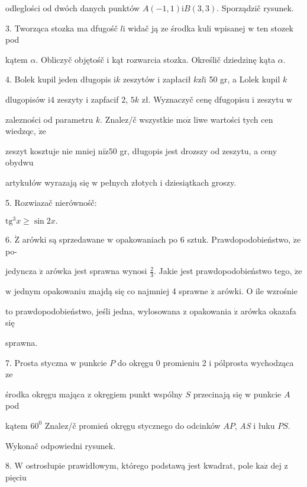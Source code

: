 \documentclass[a4paper,12pt]{article}
\begin{document}
odleglości od dwóch danych punktów $A(-1,1)\mathrm{i}B(3,3)$. Sporządzič rysunek.

3. Tworząca stozka ma dfugośč $l\mathrm{i}$ widač ją ze środka kuli wpisanej $\mathrm{w}$ ten stozek pod

kątem $\alpha$. Obliczyč objętośč $\mathrm{i}$ kąt rozwarcia stozka. Określič dziedzinę kąta $\alpha.$

4. Bolek kupil jeden długopis $\mathrm{i} k$ zeszytów $\mathrm{i}$ zapłacił $k\mathrm{z}l\mathrm{i}$ 50 gr, a Lolek kupil $k$

dlugopisów $\mathrm{i} 4$ zeszyty $\mathrm{i}$ zapfacif 2, $5k$ zł. Wyznaczyč cenę dfugopisu $\mathrm{i}$ zeszytu $\mathrm{w}$

zalezności od parametru $k$. Znalez/č wszystkie $\mathrm{m}\mathrm{o}\dot{\mathrm{z}}$ liwe wartości tych cen wiedzqc, $\dot{\mathrm{z}}\mathrm{e}$

zeszyt kosztuje nie mniej $\mathrm{n}\mathrm{i}\dot{\mathrm{z}} 50$ gr, długopis jest drozszy od zeszytu, a ceny obydwu

artykułów wyrazają się $\mathrm{w}$ pełnych złotych $\mathrm{i}$ dziesiątkach groszy.

5. Rozwiazač nierównośč:

$\mathrm{t}\mathrm{g}^{3}x\geq\sin 2x.$

6. $\dot{\mathrm{Z}}$ arówki są sprzedawane $\mathrm{w}$ opakowaniach po 6 sztuk. Prawdopodobieństwo, $\dot{\mathrm{z}}\mathrm{e}$ po-

jedyncza $\dot{\mathrm{z}}$ arówka jest sprawna wynosi $\displaystyle \frac{2}{3}$. Jakie jest prawdopodobieństwo tego, $\dot{\mathrm{z}}\mathrm{e}$

$\mathrm{w}$ jednym opakowaniu znajdą się co najmniej 4 sprawne $\dot{\mathrm{z}}$ arówki. $\mathrm{O}$ ile wzrośnie

to prawdopodobieństwo, jeśli jedna, wylosowana $\mathrm{z}$ opakowania $\dot{\mathrm{z}}$ arówka okazafa się

sprawna.

7. Prosta styczna $\mathrm{w}$ punkcie $P$ do okręgu $0$ promieniu 2 $\mathrm{i}$ pólprosta wychodząca ze

środka okręgu mająca $\mathrm{z}$ okręgiem punkt wspólny $S$ przecinają się $\mathrm{w}$ punkcie $A$ pod

kątem $60^{0}$ Znalez/č promień okręgu stycznego do odcinków $AP$, {\it AS} $\mathrm{i}$ łuku $PS.$

Wykonač odpowiedni rysunek.

8. $\mathrm{W}$ ostrosłupie prawidłowym, którego podstawą jest kwadrat, pole $\mathrm{k}\mathrm{a}\dot{\mathrm{z}}$ dej $\mathrm{z}$ pięciu
\end{document}
